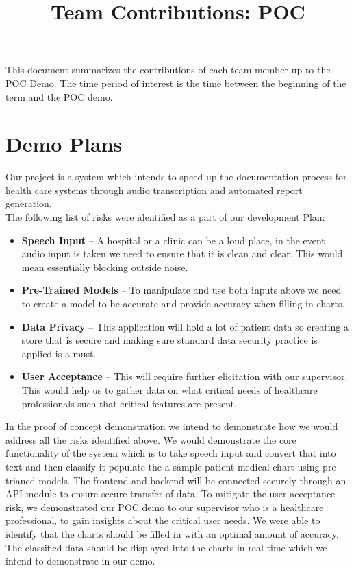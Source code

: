 \documentclass{article}
\title{Team Contributions: POC\\\progname}
\author{\authname}
\date{}
\begin{document}
\maketitle

This document summarizes the contributions of each team member up to the POC
Demo.  The time period of interest is the time between the beginning of the term
and the POC demo.

\section{Demo Plans}

Our project is a system which intends to speed up the documentation process for health care systems through audio transcription and automated report generation.\\

The following list of risks were identified as a part of our development Plan:
\begin{itemize}
  \item \textbf{Speech Input} -- A hospital or a clinic can be a loud place, in the event audio input is taken we need to ensure that it is clean and clear. This would mean essentially blocking outside noise. 
  \item \textbf{Pre-Trained Models} -- To manipulate and use both inputs above we need to create a model to be accurate and provide accuracy when filling in charts. 
  \item \textbf{Data Privacy} -- This application will hold a lot of patient data so creating a store that is secure and making sure standard data security practice is applied is a must.
  \item \textbf{User Acceptance} -- This will require further elicitation with our supervisor. This would help us to gather data on what critical needs of healthcare professionals such that critical features are present. 
\end{itemize}


In the proof of concept demonstration we intend to demonstrate how we would address all the risks identified above. We would demonstrate the core functionality of the system which is to take speech input and convert that into text and then classify it populate the a sample patient medical chart using pre trianed models. The frontend and backend will be connected securely through an API module to ensure secure transfer of data. To mitigate the user acceptance risk, we demonstrated our POC demo to our supervisor who is a healthcare professional, to gain insights about the critical user needs. We were able to identify that the charts should be filled in with an optimal amount of accuracy. The classified data should be displayed into the charts in real-time which we intend to demonstrate in our demo. \\
\end{document}
